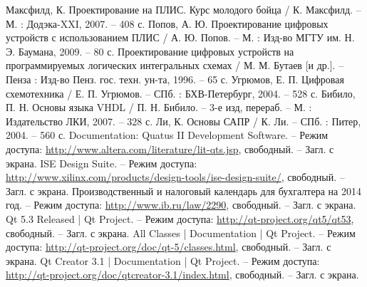 \begin{thebibliography}{0}
 Максфилд, К. Проектирование на ПЛИС. Курс молодого бойца / К. Максфилд. -- М. : Додэка-XXI, 2007. -- 408 с.
 Попов, А. Ю. Проектирование цифровых устройств с использованием ПЛИС / А. Ю. Попов. -- М. : Изд-во МГТУ им. Н. Э. Баумана, 2009. -- 80 с.
 Проектирование цифровых устройств на программируемых логических интегральных схемах / М. М. Бутаев [и др.]. -- Пенза : Изд-во Пенз. гос. техн. ун-та, 1996. -- 65 с.
 Угрюмов, Е. П. Цифровая схемотехника / Е. П. Угрюмов. -- СПб. : БХВ-Петербург, 2004. -- 528 с.
 Бибило, П. Н. Основы языка VHDL / П. Н. Бибило. -- 3-е изд, перераб. -- М. : Издательство ЛКИ, 2007. -- 328 с.
 Ли, К. Основы САПР / К. Ли. -- СПб. : Питер, 2004. -- 560 с.
 Documentation: Quatus II Development Software. -- Режим доступа: \url{http://www.altera.com/literature/lit-qts.jsp}, свободный. -- Загл. с экрана.
 ISE Design Suite. -- Режим доступа: \url{http://www.xilinx.com/products/design-tools/ise-design-suite/}, свободный. -- Загл. с экрана.
 Производственный и налоговый календарь для бухгалтера на 2014 год. -- Режим доступа: \url{http://www.ib.ru/law/2290}, свободный. -- Загл. с экрана.
 Qt 5.3 Released | Qt Project. -- Режим доступа: \url{http://qt-project.org/qt5/qt53}, свободный. -- Загл. с экрана.
 All Classes | Documentation | Qt Project. -- Режим доступа: \url{http://qt-project.org/doc/qt-5/classes.html}, свободный. -- Загл. с экрана.
 Qt Creator 3.1 | Documentation | Qt Project. -- Режим доступа: \url{http://qt-project.org/doc/qtcreator-3.1/index.html}, свободный. -- Загл. с экрана.
\end{thebibliography}